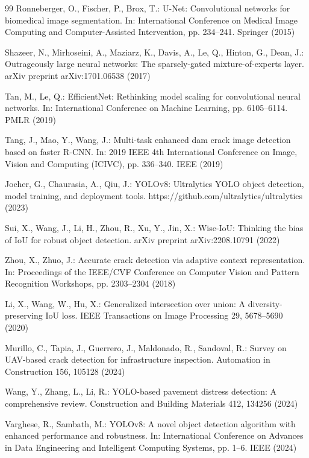 \documentclass[twocolumn]{sn-jnl}
\begin{document}
\begin{thebibliography}{99}
		Ronneberger, O., Fischer, P., Brox, T.: U-Net: Convolutional networks for biomedical image segmentation. In: International Conference on Medical Image Computing and Computer-Assisted Intervention, pp. 234–241. Springer (2015)
		
		Shazeer, N., Mirhoseini, A., Maziarz, K., Davis, A., Le, Q., Hinton, G., Dean, J.: Outrageously large neural networks: The sparsely-gated mixture-of-experts layer. arXiv preprint arXiv:1701.06538 (2017)
		
		Tan, M., Le, Q.: EfficientNet: Rethinking model scaling for convolutional neural networks. In: International Conference on Machine Learning, pp. 6105–6114. PMLR (2019)
		
		Tang, J., Mao, Y., Wang, J.: Multi-task enhanced dam crack image detection based on faster R-CNN. In: 2019 IEEE 4th International Conference on Image, Vision and Computing (ICIVC), pp. 336–340. IEEE (2019)
		
		Jocher, G., Chaurasia, A., Qiu, J.: YOLOv8: Ultralytics YOLO object detection, model training, and deployment tools. https://github.com/ultralytics/ultralytics (2023)

		Sui, X., Wang, J., Li, H., Zhou, R., Xu, Y., Jin, X.: Wise-IoU: Thinking the bias of IoU for robust object detection. arXiv preprint arXiv:2208.10791 (2022)

		Zhou, X., Zhuo, J.: Accurate crack detection via adaptive context representation. In: Proceedings of the IEEE/CVF Conference on Computer Vision and Pattern Recognition Workshops, pp. 2303–2304 (2018)

		Li, X., Wang, W., Hu, X.: Generalized intersection over union: A diversity-preserving IoU loss. IEEE Transactions on Image Processing 29, 5678–5690 (2020)

		Murillo, C., Tapia, J., Guerrero, J., Maldonado, R., Sandoval, R.: Survey on UAV-based crack detection for infrastructure inspection. Automation in Construction 156, 105128 (2024)

		Wang, Y., Zhang, L., Li, R.: YOLO-based pavement distress detection: A comprehensive review. Construction and Building Materials 412, 134256 (2024)

		Varghese, R., Sambath, M.: YOLOv8: A novel object detection algorithm with enhanced performance and robustness. In: International Conference on Advances in Data Engineering and Intelligent Computing Systems, pp. 1–6. IEEE (2024)
		

\end{thebibliography}
\end{document}
